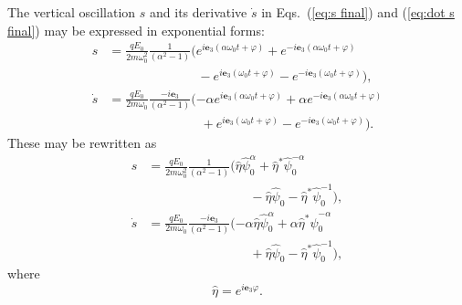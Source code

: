 \documentclass[twocolumn,showpacs,preprintnumbers,amsmath,amssymb]{revtex4}
\begin{document}
The vertical oscillation $s$ and its derivative $\dot{s}$ in Eqs.~(\ref{eq:s final}) and (\ref{eq:dot s final}) may be expressed in exponential forms:
\begin{subequations}
\begin{align}
\label{eq:s exponential}
s &= \frac{qE_0}{2m\omega_0^2}\frac{1}{(\alpha^2 - 1)}(e^{ i \mathbf e_3 (\alpha\omega_0 t +\varphi)} + e^{- i \mathbf e_3 (\alpha\omega_0 t +\varphi)}\nonumber \\ 
 & \qquad \qquad \qquad \quad - e^{ i \mathbf e_3 (\omega_0 t +\varphi)} - e^{- i \mathbf e_3 (\omega_0 t +\varphi)}),\\
\label{eq:dot s exponential}
\dot{s} &= \frac{qE_0}{2m\omega_0}\frac{- i \mathbf e_3 }{(\alpha^2 - 1)}(-\alpha e^{ i \mathbf e_3 (\alpha\omega_0 t +\varphi)} + \alpha e^{- i \mathbf e_3 (\alpha\omega_0 t +\varphi)} \nonumber \\
 &\qquad \qquad \qquad \quad \ + e^{ i \mathbf e_3 (\omega_0 t +\varphi)} - e^{- i \mathbf e_3 (\omega_0 t +\varphi)}) .
\end{align}
\end{subequations}
These may be rewritten as
\begin{subequations}
\begin{align}
\label{eq:s psi eta}
s &= \frac{qE_0}{2m\omega_0^2}\frac{1}{(\alpha^2 - 1)}(\hat\eta\hat\psi_0^\alpha +\hat\eta^*\hat\psi_0^{-\alpha}\nonumber \\ & \qquad \qquad \qquad \qquad -\hat\eta\hat\psi_0 -\hat\eta^*\hat\psi_0^{-1}),\\
\label{eq:dot s psi eta}
\dot s &= \frac{qE_0}{2m\omega_0}\frac{- i \mathbf e_3 }{(\alpha^2 - 1)}(-\alpha\hat\eta\hat\psi_0^\alpha + \alpha\hat\eta^*\hat\psi_0^{-\alpha} \nonumber \\
& \qquad \qquad \qquad \qquad + \hat\eta\hat\psi_0 - \hat\eta^*\hat\psi_0^{-1}),
\end{align}
\end{subequations}
where 
\begin{equation}
\hat\eta = e^{ i \mathbf e_3 \varphi}.
\end{equation}
\end{document}
